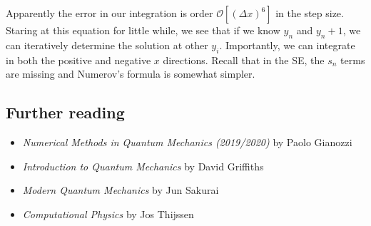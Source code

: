 \documentclass[prb,aps,11pt,superscriptaddress,floatfix]{revtex4-2}
\begin{document}
Apparently the error in our integration is order $\mathcal{O}[(\Delta x)^6]$ in the step size. Staring at this equation for little while, we see that if we know $y_n$ and $y_n+1$, we can iteratively determine the solution at other $y_i$. Importantly, we can integrate in both the positive and negative $x$ directions. Recall that in the SE, the $s_n$ terms are missing and Numerov's formula is somewhat simpler. 



\subsection{Further reading}

\begin{itemize}
  \item \emph{Numerical Methods in Quantum Mechanics (2019/2020)} by Paolo Gianozzi
  \item \emph{Introduction to Quantum Mechanics} by David Griffiths
  \item \emph{Modern Quantum Mechanics} by Jun Sakurai
  \item \emph{Computational Physics} by Jos Thijssen
\end{itemize}




\end{document}
